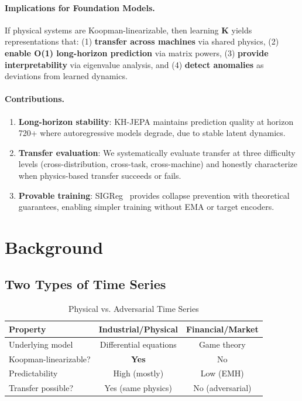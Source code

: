 \documentclass{article}
\begin{document}
\paragraph{Implications for Foundation Models.} If physical systems are Koopman-linearizable, then learning $\mathbf{K}$ yields representations that: (1) \textbf{transfer across machines} via shared physics, (2) \textbf{enable O(1) long-horizon prediction} via matrix powers, (3) \textbf{provide interpretability} via eigenvalue analysis, and (4) \textbf{detect anomalies} as deviations from learned dynamics.

\paragraph{Contributions.}
\begin{enumerate}
    \item \textbf{Long-horizon stability}: KH-JEPA maintains prediction quality at horizon 720+ where autoregressive models degrade, due to stable latent dynamics.
    \item \textbf{Transfer evaluation}: We systematically evaluate transfer at three difficulty levels (cross-distribution, cross-task, cross-machine) and honestly characterize when physics-based transfer succeeds or fails.
    \item \textbf{Provable training}: SIGReg~\cite{lejepa2024} provides collapse prevention with theoretical guarantees, enabling simpler training without EMA or target encoders.
\end{enumerate}

\section{Background}

\subsection{Two Types of Time Series}

\begin{table}[h]
\centering
\caption{Physical vs. Adversarial Time Series}
\small
\begin{tabular}{@{}lcc@{}}
\toprule
\textbf{Property} & \textbf{Industrial/Physical} & \textbf{Financial/Market} \\
\midrule
Underlying model & Differential equations & Game theory \\
Koopman-linearizable? & \textbf{Yes} & No \\
Predictability & High (mostly) & Low (EMH) \\
Transfer possible? & Yes (same physics) & No (adversarial) \\
\bottomrule
\end{tabular}
\end{table}
\end{document}
